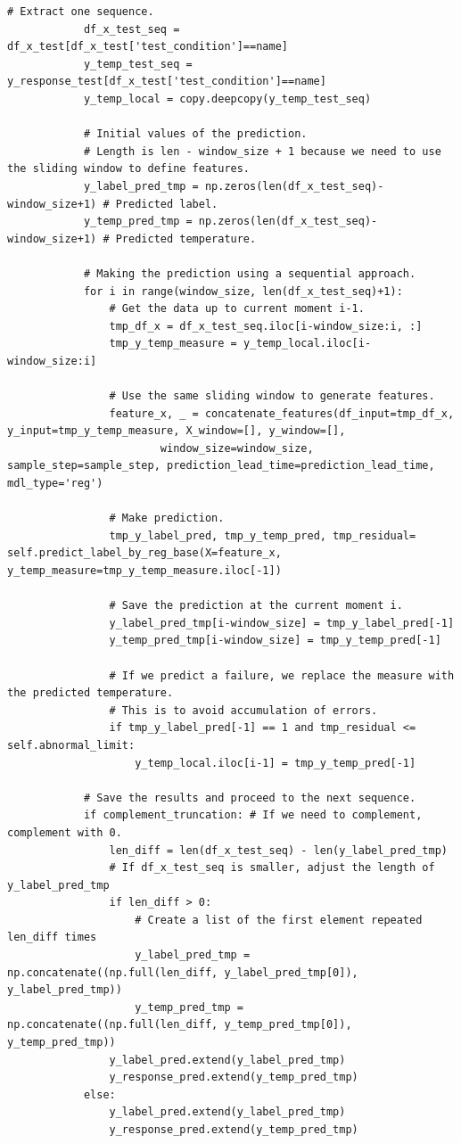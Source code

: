 \documentclass[11pt,a4paper]{article}
\begin{document}
\begin{lstlisting}[style=pyfull]
            # Extract one sequence.
            df_x_test_seq = df_x_test[df_x_test['test_condition']==name]
            y_temp_test_seq = y_response_test[df_x_test['test_condition']==name]
            y_temp_local = copy.deepcopy(y_temp_test_seq)

            # Initial values of the prediction.
            # Length is len - window_size + 1 because we need to use the sliding window to define features.
            y_label_pred_tmp = np.zeros(len(df_x_test_seq)-window_size+1) # Predicted label.
            y_temp_pred_tmp = np.zeros(len(df_x_test_seq)-window_size+1) # Predicted temperature.

            # Making the prediction using a sequential approach.
            for i in range(window_size, len(df_x_test_seq)+1):
                # Get the data up to current moment i-1.
                tmp_df_x = df_x_test_seq.iloc[i-window_size:i, :]
                tmp_y_temp_measure = y_temp_local.iloc[i-window_size:i]

                # Use the same sliding window to generate features.
                feature_x, _ = concatenate_features(df_input=tmp_df_x, y_input=tmp_y_temp_measure, X_window=[], y_window=[],
                        window_size=window_size, sample_step=sample_step, prediction_lead_time=prediction_lead_time, mdl_type='reg')

                # Make prediction.
                tmp_y_label_pred, tmp_y_temp_pred, tmp_residual= self.predict_label_by_reg_base(X=feature_x, y_temp_measure=tmp_y_temp_measure.iloc[-1])

                # Save the prediction at the current moment i.
                y_label_pred_tmp[i-window_size] = tmp_y_label_pred[-1]
                y_temp_pred_tmp[i-window_size] = tmp_y_temp_pred[-1]

                # If we predict a failure, we replace the measure with the predicted temperature.
                # This is to avoid accumulation of errors.
                if tmp_y_label_pred[-1] == 1 and tmp_residual <= self.abnormal_limit:
                    y_temp_local.iloc[i-1] = tmp_y_temp_pred[-1]

            # Save the results and proceed to the next sequence.
            if complement_truncation: # If we need to complement, complement with 0.
                len_diff = len(df_x_test_seq) - len(y_label_pred_tmp)
                # If df_x_test_seq is smaller, adjust the length of y_label_pred_tmp
                if len_diff > 0:
                    # Create a list of the first element repeated len_diff times
                    y_label_pred_tmp = np.concatenate((np.full(len_diff, y_label_pred_tmp[0]), y_label_pred_tmp))
                    y_temp_pred_tmp = np.concatenate((np.full(len_diff, y_temp_pred_tmp[0]), y_temp_pred_tmp))
                y_label_pred.extend(y_label_pred_tmp)
                y_response_pred.extend(y_temp_pred_tmp)
            else:
                y_label_pred.extend(y_label_pred_tmp)
                y_response_pred.extend(y_temp_pred_tmp)


\end{lstlisting}
\end{document}
